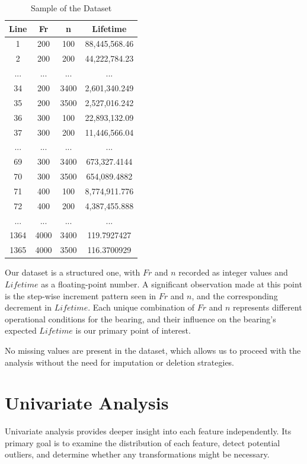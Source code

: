 \begin{table}[ht]
  \centering
  \caption{Sample of the Dataset}
  \label{table:bearings-dataset}
  \begin{tabular}{|c|c|c|c|}
  \hline
  Line & Fr & n & Lifetime \\
  \hline
  1 & 200 & 100 & 88,445,568.46 \\
  2 & 200 & 200 & 44,222,784.23 \\
  ... & ... & ... & ... \\
  34 & 200 & 3400 & 2,601,340.249 \\
  35 & 200 & 3500 & 2,527,016.242 \\
  36 & 300 & 100 & 22,893,132.09 \\
  37 & 300 & 200 & 11,446,566.04 \\
  ... & ... & ... & ... \\
  69 & 300 & 3400 & 673,327.4144 \\
  70 & 300 & 3500 & 654,089.4882 \\
  71 & 400 & 100 & 8,774,911.776 \\
  72 & 400 & 200 & 4,387,455.888 \\
  ... & ... & ... & ... \\
  1364 & 4000 & 3400 & 119.7927427 \\
  1365 & 4000 & 3500 & 116.3700929 \\
  \hline
  \end{tabular}
\end{table}

Our dataset is a structured one, with $Fr$ and $n$ recorded as integer values and $Lifetime$ as a floating-point number. A significant observation made at this point is the step-wise increment pattern seen in $Fr$ and $n$, and the corresponding decrement in $Lifetime$. Each unique combination of $Fr$ and $n$ represents different operational conditions for the bearing, and their influence on the bearing's expected $Lifetime$ is our primary point of interest.

No missing values are present in the dataset, which allows us to proceed with the analysis without the need for imputation or deletion strategies.


\section{Univariate Analysis}

Univariate analysis provides deeper insight into each feature independently. Its primary goal is to examine the distribution of each feature, detect potential outliers, and determine whether any transformations might be necessary.

